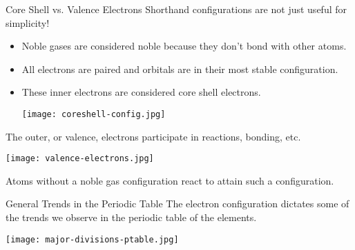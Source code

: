 \documentclass[notes=show]{beamer}
\begin{document}
\begin{frame}[allowframebreaks]{Core Shell vs. Valence Electrons}
	Shorthand configurations are not just useful for simplicity!
	\begin{itemize}
		\item Noble gases are considered noble because they don't bond
			with other atoms.
		\item All electrons are paired and orbitals are in their most
			stable configuration.
		\item These inner electrons are considered \alert{core shell}
			electrons.
			\smallskip
			\begin{center}
		\texttt{[image: coreshell-config.jpg]}
	\end{center}
	\end{itemize}

	\framebreak%

	The outer, or \alert{valence}, electrons participate in
	reactions, bonding, etc.
	\begin{center}
		\texttt{[image: valence-electrons.jpg]}
	\end{center}
	Atoms without a \alert{noble gas configuration} react to attain such a
	configuration.
\end{frame}


\begin{frame}{General Trends in the Periodic Table}
	The electron configuration dictates some of the trends we observe in the
	periodic table of the elements.
	\begin{center}
		\texttt{[image: major-divisions-ptable.jpg]}
	\end{center}
\end{frame}
\end{document}

